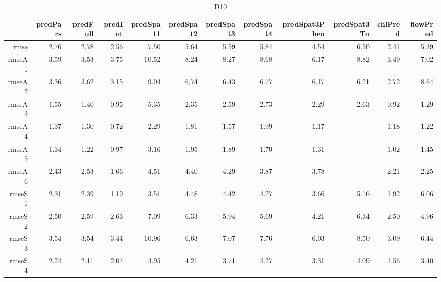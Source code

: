 \begin{table}[H]
\centering
\begingroup\fontsize{2.5pt}{4pt}\selectfont
\begin{tabular}{rrrrrrrrrrrr}
  \hline
 & predPars & predFull & predInt & predSpat1 & predSpat2 & predSpat3 & predSpat4 & predSpat3Pheo & predSpat3Tn & chlPred & flowPred \\ 
  \hline
rmse & 2.76 & 2.78 & 2.56 & 7.50 & 5.64 & 5.59 & 5.84 & 4.54 & 6.50 & 2.41 & 5.39 \\ 
  rmseA1 & 3.59 & 3.53 & 3.75 & 10.52 & 8.24 & 8.27 & 8.68 & 6.17 & 8.82 & 3.49 & 7.02 \\ 
  rmseA2 & 3.36 & 3.62 & 3.15 & 9.04 & 6.74 & 6.43 & 6.77 & 6.17 & 6.21 & 2.72 & 8.64 \\ 
  rmseA3 & 1.55 & 1.40 & 0.95 & 5.35 & 2.35 & 2.59 & 2.73 & 2.29 & 2.63 & 0.92 & 1.29 \\ 
  rmseA4 & 1.37 & 1.30 & 0.72 & 2.29 & 1.81 & 1.57 & 1.99 & 1.17 &  & 1.18 & 1.22 \\ 
  rmseA5 & 1.34 & 1.22 & 0.97 & 3.16 & 1.95 & 1.89 & 1.70 & 1.31 &  & 1.02 & 1.45 \\ 
  rmseA6 & 2.43 & 2.53 & 1.66 & 4.51 & 4.40 & 4.29 & 3.87 & 3.78 &  & 2.21 & 2.25 \\ 
  rmseS1 & 2.31 & 2.39 & 1.19 & 3.51 & 4.48 & 4.42 & 4.27 & 3.66 & 5.16 & 1.92 & 6.06 \\ 
  rmseS2 & 2.50 & 2.59 & 2.63 & 7.09 & 6.33 & 5.94 & 5.69 & 4.21 & 6.34 & 2.50 & 4.96 \\ 
  rmseS3 & 3.54 & 3.54 & 3.44 & 10.96 & 6.63 & 7.07 & 7.76 & 6.03 & 8.50 & 3.09 & 6.44 \\ 
  rmseS4 & 2.24 & 2.11 & 2.07 & 4.95 & 4.21 & 3.71 & 4.27 & 3.31 & 4.09 & 1.56 & 3.40 \\ 
   \hline
\end{tabular}
\endgroup
\caption{D10} 
\end{table}
